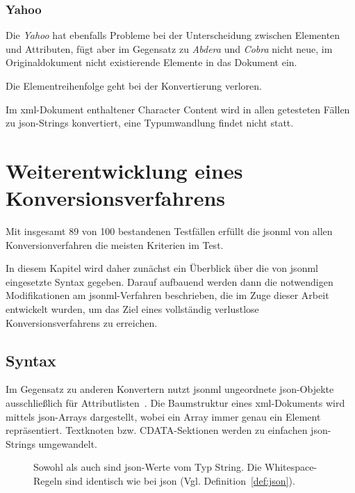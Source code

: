 
\subsection{Yahoo}
\label{sec:xmljson-yahoo}

Die \emph{Yahoo} hat ebenfalls Probleme bei der Unterscheidung zwischen Elementen und Attributen, fügt aber im Gegensatz zu \emph{Abdera} und \emph{Cobra} nicht neue, im Originaldokument nicht existierende Elemente in das Dokument ein.

Die Elementreihenfolge geht bei der Konvertierung verloren.

Im \acrshort{xml}-Dokument enthaltener Character Content wird in allen getesteten Fällen zu \acrshort{json}-Strings konvertiert, eine Typumwandlung findet nicht statt.

\chapter{Weiterentwicklung eines Konversionsverfahrens}
\label{chap:jsonml}

Mit insgesamt 89 von 100 bestandenen Testfällen erfüllt die \acrfull{jsonml} von allen Konversionverfahren die meisten Kriterien im Test.

In diesem Kapitel wird daher zunächst ein Überblick über die von \acrshort{jsonml} eingesetzte Syntax gegeben.
Darauf aufbauend werden dann die notwendigen Modifikationen am \acrshort{jsonml}-Verfahren beschrieben, die im Zuge dieser Arbeit entwickelt wurden, um das Ziel eines vollständig verlustlose Konversionsverfahrens zu erreichen.

\section{Syntax}

Im Gegensatz zu anderen Konvertern nutzt \acrshort{jsonml} ungeordnete \acrshort{json}-Objekte ausschließlich für Attributlisten~\cite{jsonmlsyntax}. Die Baumstruktur eines \acrshort{xml}-Dokuments wird mittels \acrshort{json}-Arrays dargestellt, wobei ein Array immer genau ein Element repräsentiert. Textknoten bzw. CDATA-Sektionen werden zu einfachen \acrshort{json}-Strings umgewandelt.

\begin{figure}[H]
    \begin{definition}
        \label{def:jsonml}
        Sowohl  als auch  sind \acrshort{json}-Werte vom Typ String. Die Whitespace-Regeln sind identisch wie bei \acrshort{json} (Vgl. Definition~\ref{def:json}).
        \begin{grammar}
            
        \end{grammar}
    \end{definition}
\end{figure}

